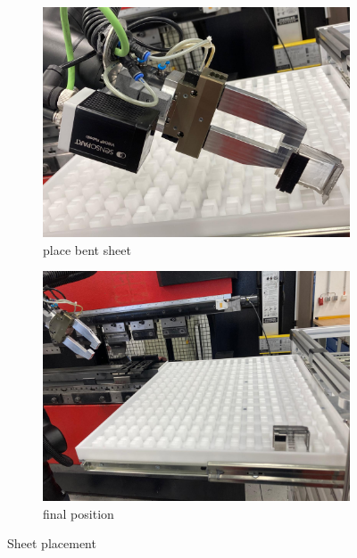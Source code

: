 \begin{figure}[!ht]
    \centering
    \begin{subfigure}[b]{0.48\textwidth}
        \centering
        \includegraphics[width=\textwidth]{figures/shelf-control/sheet-placement-01.png}
        \caption{place bent sheet}
        \label{subfig:sheet-placement1}
    \end{subfigure}\hspace{0.1cm}
    \begin{subfigure}[b]{0.48\textwidth}
        \centering
        \includegraphics[width=\textwidth]{figures/shelf-control/sheet-placement-02.png}
        \caption{final position}
        \label{subfig:sheet-placement2}
    \end{subfigure}\hspace{0.1cm}
    \caption{Sheet placement}
    \label{fig:sheet-placement}
\end{figure}


